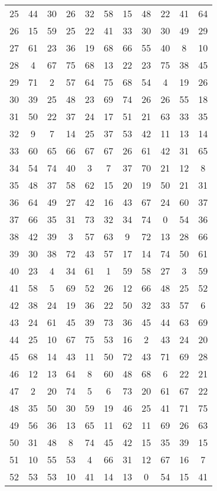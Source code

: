 \begin{table}
\begin{tabular}{c c c c c c c c c c c }
25 & 44 & 30 & 26 & 32 & 58 & 15 & 48 & 22 & 41 & 64 \\
26 & 15 & 59 & 25 & 22 & 41 & 33 & 30 & 30 & 49 & 29 \\
27 & 61 & 23 & 36 & 19 & 68 & 66 & 55 & 40 & 8 & 10 \\
28 & 4 & 67 & 75 & 68 & 13 & 22 & 23 & 75 & 38 & 45 \\
29 & 71 & 2 & 57 & 64 & 75 & 68 & 54 & 4 & 19 & 26 \\
30 & 39 & 25 & 48 & 23 & 69 & 74 & 26 & 26 & 55 & 18 \\
31 & 50 & 22 & 37 & 24 & 17 & 51 & 21 & 63 & 33 & 35 \\
32 & 9 & 7 & 14 & 25 & 37 & 53 & 42 & 11 & 13 & 14 \\
33 & 60 & 65 & 66 & 67 & 67 & 26 & 61 & 42 & 31 & 65 \\
34 & 54 & 74 & 40 & 3 & 7 & 37 & 70 & 21 & 12 & 8 \\
35 & 48 & 37 & 58 & 62 & 15 & 20 & 19 & 50 & 21 & 31 \\
36 & 64 & 49 & 27 & 42 & 16 & 43 & 67 & 24 & 60 & 37 \\
37 & 66 & 35 & 31 & 73 & 32 & 34 & 74 & 0 & 54 & 36 \\
38 & 42 & 39 & 3 & 57 & 63 & 9 & 72 & 13 & 28 & 66 \\
39 & 30 & 38 & 72 & 43 & 57 & 17 & 14 & 74 & 50 & 61 \\
40 & 23 & 4 & 34 & 61 & 1 & 59 & 58 & 27 & 3 & 59 \\
41 & 58 & 5 & 69 & 52 & 26 & 12 & 66 & 48 & 25 & 52 \\
42 & 38 & 24 & 19 & 36 & 22 & 50 & 32 & 33 & 57 & 6 \\
43 & 24 & 61 & 45 & 39 & 73 & 36 & 45 & 44 & 63 & 69 \\
44 & 25 & 10 & 67 & 75 & 53 & 16 & 2 & 43 & 24 & 20 \\
45 & 68 & 14 & 43 & 11 & 50 & 72 & 43 & 71 & 69 & 28 \\
46 & 12 & 13 & 64 & 8 & 60 & 48 & 68 & 6 & 22 & 21 \\
47 & 2 & 20 & 74 & 5 & 6 & 73 & 20 & 61 & 67 & 22 \\
48 & 35 & 50 & 30 & 59 & 19 & 46 & 25 & 41 & 71 & 75 \\
49 & 56 & 36 & 13 & 65 & 11 & 62 & 11 & 69 & 26 & 63 \\
50 & 31 & 48 & 8 & 74 & 45 & 42 & 15 & 35 & 39 & 15 \\
51 & 10 & 55 & 53 & 4 & 66 & 31 & 12 & 67 & 16 & 7 \\
52 & 53 & 53 & 10 & 41 & 14 & 13 & 0 & 54 & 15 & 41 \\

\end{tabular}
\end{table}
